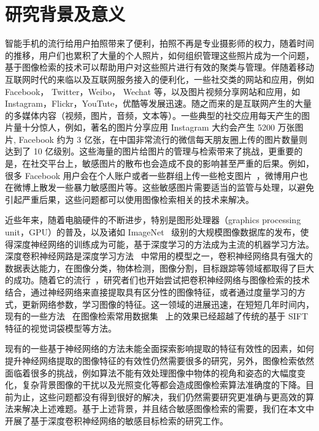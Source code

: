 \section{研究背景及意义}
智能手机的流行给用户拍照带来了便利，拍照不再是专业摄影师的权力，随着时间的推移，用户们也累积了大量的个人照片，如何组织管理这些照片成为一个问题，基于图像检索的技术可以帮助用户对这些照片进行有效的聚类与管理。伴随着移动互联网时代的来临以及互联网服务接入的便利化，一些社交类的网站和应用，例如 Facebook， Twitter，Weibo， Wechat 等，以及图片视频分享网站和应用，如 Instagram，Flickr，YouTute，优酷等发展迅速。随之而来的是互联网产生的大量的多媒体内容（视频，图片，音频，文本等）。一些典型的社交应用每天产生的图片量十分惊人，例如，著名的图片分享应用 Instagram 大约会产生 5200 万张图片, Facebook 约为 3 亿张，在中国非常流行的微信每天朋友圈上传的图片数量则达到了 10 亿级别。这些海量的图片给图片的管理与检索带来了挑战，更重要的是，在社交平台上，敏感图片的散布也会造成不良的影响甚至严重的后果。例如，很多 Facebook 用户会在个人账户或者一些群组上传一些枪支图片~\cite{Drange2016,MELE2016FacebookBG}，微博用户也在微博上散发一些暴力敏感图片等。这些敏感图片需要适当的监管与处理，以避免引起严重后果，这些问题都可以使用图像检索相关的技术来解决。

近些年来，随着电脑硬件的不断进步，特别是图形处理器（graphics processing unit，GPU）的普及，以及诸如 ImageNet~\cite{Russakovsky2015ImageNetLS} 级别的大规模图像数据库的发布，使得深度神经网络的训练成为可能，基于深度学习的方法成为主流的机器学习方法。深度卷积神经网路是深度学习方法~\cite{lecun2015deep} 中常用的模型之一，卷积神经网络具有强大的数据表达能力，在图像分类，物体检测，图像分割，目标跟踪等领域都取得了巨大的成功。随着它的流行~\cite{Krizhevsky2012ImageNetCW}，研究者们也开始尝试把卷积神经网络与图像检索的技术结合，通过神经网络来直接提取具有区分性的图像特征，或者通过度量学习的方式，更新网络参数，学习图像的特征。这一领域的进展迅速，在短短几年时间内，现有的一些方法~\cite{Gordo2016DeepIR} 在图像检索常用数据集~\cite{Philbin2007ObjectRW,Philbin2008LostIQ,Nistr2006ScalableRW,Jgou2008HammingEA} 上的效果已经超越了传统的基于 SIFT 特征的视觉词袋模型等方法。

现有的一些基于神经网络的方法未能全面探索影响提取的特征有效性的因素，如何提升神经网络提取的图像特征的有效性仍然需要很多的研究，另外，图像检索依然面临着很多的挑战，例如算法不能有效处理图像中物体的视角和姿态的大幅度变化，复杂背景图像的干扰以及光照变化等都会造成图像检索算法准确度的下降。目前为止，这些问题都没有得到很好的解决，我们仍然需要研究更准确与更高效的算法来解决上述难题。基于上述背景，并且结合敏感图像检索的需要，我们在本文中开展了基于深度卷积神经网络的敏感目标检索的研究工作。

